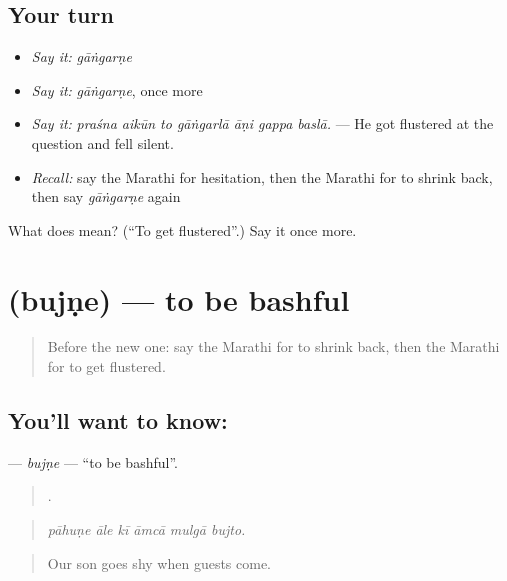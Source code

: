\subsection*{Your turn}
\begin{itemize}
\raggedright
  \item \emph{Say it:} \emph{gāṅgarṇe}
  \item \emph{Say it:} \emph{gāṅgarṇe}, once more
  \item \emph{Say it:} \emph{praśna aikūn to gāṅgarlā āṇi gappa baslā.} — He got flustered at the question and fell silent.
  \item \emph{Recall:} say the Marathi for hesitation, then the Marathi for to shrink back, then say \emph{gāṅgarṇe} again
\end{itemize}

\begin{tcolorbox}[breakable,colback=teal!4,colframe=teal!35!black,title={Before you move on}]
What does  mean? (\textquotedblleft{}To get flustered\textquotedblright{}.) Say it once more.
\end{tcolorbox}
\section[\texorpdfstring{\mr{बुजणे} (bujṇe)}{बुजणे (bujṇe)}]{ (bujṇe) — to be bashful}

\label{lesson:MR-C456-bujne}



\begin{quote}
Before the new one: say the Marathi for to shrink back, then the Marathi for to get flustered.
\end{quote}

\subsection*{You'll want to know: }
\textbf{} — \emph{bujṇe} — \textquotedblleft{}to be bashful\textquotedblright{}.

\begin{quote}
     .
\end{quote}

\begin{quote}
\emph{pāhuṇe āle kī āmcā mulgā bujto.}
\end{quote}

\begin{quote}
Our son goes shy when guests come.
\end{quote}

